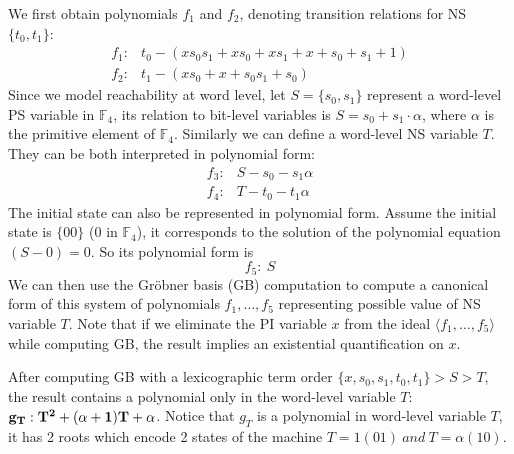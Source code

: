 \begin{Example}
We first obtain polynomials $f_1$ and $f_2$, denoting transition relations for NS $\{t_0,t_1\}$:
\begin{displaymath}
\begin{array}{ll}
f_1:& t_0- (xs_0s_1+xs_0+xs_1+x+s_0+s_1+1) \\
f_2:& t_1 - (xs_0+x+s_0s_1+s_0)\
\end{array}
\end{displaymath}
Since we model reachability at word level, let $S = \{s_0,s_1\}$ represent a word-level PS variable in $\mathbb F_4$,
its relation to bit-level variables is $S = s_0 + s_1\cdot \alpha$, where $\alpha$ is the primitive element
of $\mathbb F_4$. Similarly we can define a word-level NS variable $T$. They can be both interpreted in polynomial form:
\begin{displaymath}
\begin{array}{ll}
f_3:& S - s_0 - s_1\alpha \\
f_4:& T - t_0 - t_1\alpha
\end{array}
\end{displaymath}
The initial state can also be represented in polynomial form. Assume the initial state is $\{00\}$ ($0$ in $\mathbb F_4$),
it corresponds to the solution of the polynomial equation $(S-0) = 0$. So its polynomial form is
\begin{displaymath}
f_5:\  S
\end{displaymath}
We can then use the Gr\"obner basis (GB) computation to compute a canonical form of this system of polynomials
$f_1,\dots, f_5$ representing possible value of NS variable $T$. Note that
if we eliminate the PI variable $x$ from the ideal $\langle f_1,\dots,f_5\rangle$ while computing GB, the result
implies an existential quantification on $x$.

After computing GB with a lexicographic term order $\{x,s_0,s_1,t_0,t_1\} > S > T$, the result contains a polynomial
only in the word-level variable $T$: ${\bf g_T:T^2+(\alpha+1)T+\alpha}$. 
Notice that $g_T$ is a polynomial in word-level variable $T$, it has 2 roots which encode 2 states of the machine  $T = 1(01)\ and 
\ T = \alpha(10)$.
\end{Example}
